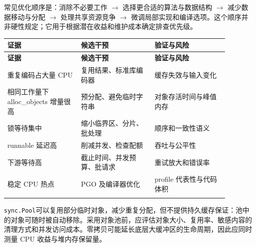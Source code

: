 \documentclass[UTF8,fontset=fandol,openany,11pt]{ctexbook}
\begin{document}
常见优化顺序是：消除不必要工作 \ensuremath{\rightarrow}\allowbreak{} 选择更合适的算法与数据结构 \ensuremath{\rightarrow}\allowbreak{} 减少数据移动与分配 \ensuremath{\rightarrow}\allowbreak{} 处理共享资源竞争 \ensuremath{\rightarrow}\allowbreak{} 微调局部实现和编译选项。这个顺序并非硬性规定；它用于根据潜在收益和维护成本确定排查优先级。

\begingroup\small\setlength{\tabcolsep}{4pt}
\begin{longtable}{>{\raggedright\arraybackslash}p{0.298\linewidth}>{\raggedright\arraybackslash}p{0.298\linewidth}>{\raggedright\arraybackslash}p{0.298\linewidth}}
\toprule
\textbf{证据} & \textbf{候选干预} & \textbf{验证与风险} \\
\midrule
\endfirsthead
\toprule
\textbf{证据} & \textbf{候选干预} & \textbf{验证与风险} \\
\midrule
\endhead
重复编码占大量 CPU & 复用结果、标准库编码器 & 缓存失效与输入变化 \\
\addlinespace[3pt]
相同工作量下 alloc\_objects 增量很高 & 预分配、避免临时字符串 & 对象存活时间与峰值内存 \\
\addlinespace[3pt]
锁等待集中 & 缩小临界区、分片、批处理 & 顺序和一致性语义 \\
\addlinespace[3pt]
runnable 延迟高 & 削减并发、检查配额 & 吞吐与公平性 \\
\addlinespace[3pt]
下游等待高 & 截止时间、并发预算、批请求 & 重试放大和错误率 \\
\addlinespace[3pt]
稳定 CPU 热点 & PGO 及编译器优化 & profile 代表性与代码体积 \\
\addlinespace[3pt]
\bottomrule
\end{longtable}
\endgroup
\texttt{sync.\allowbreak{}Pool}可以复用部分临时对象，减少重复分配，但不提供持久缓存保证：池中的对象可随时被自动移除。采用对象池前，应评估对象大小、复用率、敏感内容的清理方式和并发访问成本。零拷贝可能延长底层大缓冲区的生命周期，因此应同时测量 CPU 收益与堆内存保留量。\cite{go-sync-pool}
\end{document}
